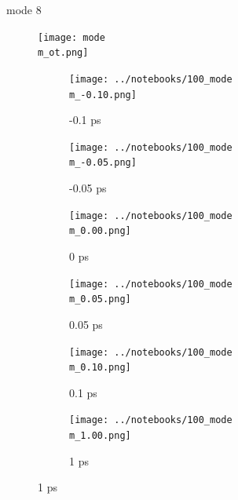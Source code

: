 \documentclass{beamer}
\newcommand\w{0.32}
\begin{document}
\renewcommand\m{8}
\begin{frame}{mode \m}
	\vspace{\vh mm}
\begin{figure}
	\centering
	\texttt{[image: mode\\m\_ot.png]}
\end{figure}
	\begin{figure}
		\centering
		\begin{subfigure}[b]{\w\textwidth}
			\centering
			\texttt{[image: ../notebooks/100\_mode\\m\_-0.10.png]}
			\caption{-0.1 ps}
		\end{subfigure}
		\begin{subfigure}[b]{\w\textwidth}
			\centering
			\texttt{[image: ../notebooks/100\_mode\\m\_-0.05.png]}
			\caption{-0.05 ps}
		\end{subfigure}
		\begin{subfigure}[b]{\w\textwidth}
			\centering
			\texttt{[image: ../notebooks/100\_mode\\m\_0.00.png]}
			\caption{0 ps}
		\end{subfigure}
		\begin{subfigure}[b]{\w\textwidth}
			\centering
			\texttt{[image: ../notebooks/100\_mode\\m\_0.05.png]}
			\caption{0.05 ps}
		\end{subfigure}
		\begin{subfigure}[b]{\w\textwidth}
			\centering
			\texttt{[image: ../notebooks/100\_mode\\m\_0.10.png]}
			\caption{0.1 ps}
		\end{subfigure}
		\begin{subfigure}[b]{\w\textwidth}
			\centering
			\texttt{[image: ../notebooks/100\_mode\\m\_1.00.png]}
			\caption{1 ps}
		\end{subfigure}
	\end{figure}
\end{frame}
\end{document}
